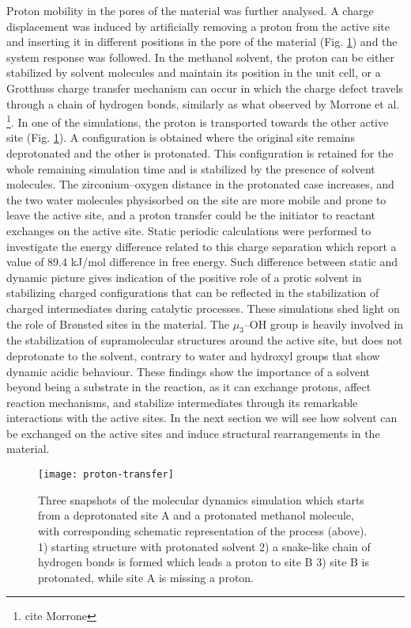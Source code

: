Proton mobility in the pores of the material was further analysed. A charge displacement was induced by artificially removing a proton from the active site and inserting it in different positions in the pore of the material (Fig. \ref{fig:proton-transfer}) and the system response was followed. In the methanol solvent, the proton can be either stabilized by solvent molecules and maintain its position in the unit cell, or a Grotthuss charge transfer mechanism can occur in which the charge defect travels through a chain of hydrogen bonds, similarly as what observed by Morrone et al. \footnote{cite Morrone}. In one of the simulations, the proton is transported towards the other active site (Fig. \ref{fig:proton-transfer}). A configuration is obtained where the original site remains deprotonated and the other is protonated. This configuration is retained for the whole remaining simulation time and is stabilized by the presence of solvent molecules. The zirconium--oxygen distance in the protonated case increases, and the two water molecules physisorbed on the site are more mobile and prone to leave the active site, and a proton transfer could be the initiator to reactant exchanges on the active site. Static periodic calculations were performed to investigate the energy difference related to this charge separation which report a value of 89.4 kJ/mol difference in free energy. Such difference between static and dynamic picture gives indication of the positive role of a protic solvent in stabilizing charged configurations that can be reflected in the stabilization of charged intermediates during catalytic processes. These simulations shed light on the role of Br\o{}nsted sites in the material. The $\mu_3$--OH group is heavily involved in the stabilization of supramolecular structures around the active site, but does not deprotonate to the solvent, contrary to water and hydroxyl groups that show dynamic acidic behaviour. These findings show the importance of a solvent beyond being a substrate in the reaction, as it can exchange protons, affect reaction mechanisms, and stabilize intermediates through its remarkable interactions with the active sites. In the next section we will see how solvent can be exchanged on the active sites and induce structural rearrangements in the material.

\begin{figure}[!htbp]
	\centering
	\texttt{[image: proton-transfer]}
	\caption{Three snapshots of the molecular dynamics simulation which starts from a deprotonated site A and a protonated methanol molecule, with corresponding schematic representation of the process (above). 1) starting structure with protonated solvent 2) a snake-like chain of hydrogen bonds is formed which leads a proton to site B 3) site B is protonated, while site A is missing a proton.}
	\label{fig:proton-transfer}
\end{figure}

